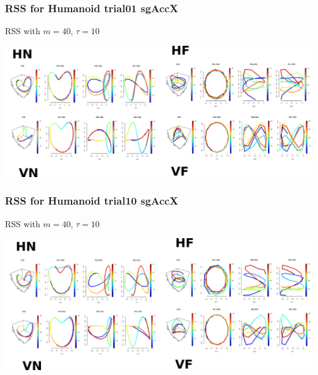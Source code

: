 \documentclass{beamer}
\begin{document}
\begin{frame}
\frametitle{RSS for Humanoid trial01 sgAccX}

RSS with $m=40$, $\tau=10$
\begin{adjustwidth}{-3em}{-3em}
\includegraphics[width=1.2\textwidth]{Robot_p01rss}
\end{adjustwidth}

\end{frame}


\begin{frame}
\frametitle{RSS for Humanoid trial10 sgAccX}

RSS with $m=40$, $\tau=10$
\begin{adjustwidth}{-3em}{-3em}
\includegraphics[width=1.2\textwidth]{Robot_p10rss}
\end{adjustwidth}

\end{frame}
\end{document}
